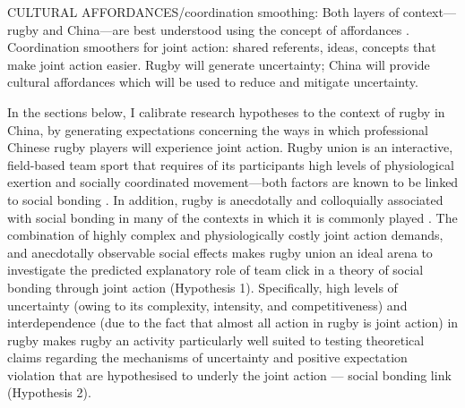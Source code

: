\begin{CJK}{UTF8}{gbsn}
CULTURAL AFFORDANCES/coordination smoothing:
Both layers of context---rugby and China---are best understood using the concept of affordances \citep{Ramstead2016}.
Coordination smoothers for joint action: shared referents, ideas, concepts that make joint action easier. Rugby will generate uncertainty; China will provide cultural affordances which will be used to reduce and mitigate uncertainty.


In the sections below, I calibrate research hypotheses to the context of rugby in China, by generating expectations concerning the ways in which professional Chinese rugby players will experience joint action.  Rugby union is an interactive, field-based team sport that requires of its participants high levels of physiological exertion and socially coordinated movement---both factors are known to be linked to social bonding \citep{Cohen2017,Davis2015}. In addition, rugby is anecdotally and colloquially associated with social bonding in many of the contexts in which it is commonly played \citep{Dunning2005}.  The combination of highly complex and physiologically costly joint action demands, and anecdotally observable social effects makes rugby union an ideal arena to investigate the predicted explanatory role of team click in a theory of social bonding through joint action (Hypothesis 1).  Specifically, high levels of uncertainty (owing to its complexity, intensity, and competitiveness) and interdependence (due to the fact that almost all action in rugby is joint action) in rugby makes rugby an activity particularly well suited to testing theoretical claims regarding the mechanisms of uncertainty and positive expectation violation that are hypothesised to underly the joint action --- social bonding link (Hypothesis 2).


\end{CJK}
